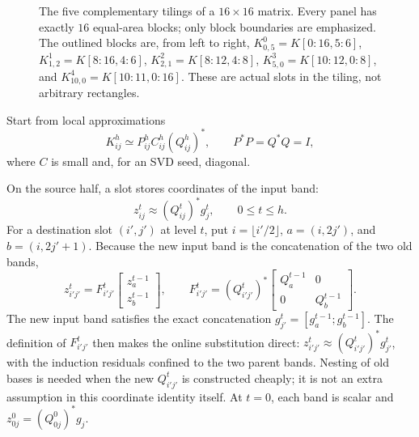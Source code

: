 \documentclass[11pt,a4paper]{article}
\begin{document}
\begin{figure}[htbp]
\caption{The five complementary tilings of a $16\times16$ matrix.  Every panel has exactly $16$ equal-area blocks; only block boundaries are emphasized.  The outlined blocks are, from left to right, $K_{0,5}^0=K[0:16,5:6]$, $K_{1,2}^1=K[8:16,4:6]$, $K_{2,1}^2=K[8:12,4:8]$, $K_{5,0}^3=K[10:12,0:8]$, and $K_{10,0}^4=K[10:11,0:16]$.  These are actual slots in the tiling, not arbitrary rectangles.}
\label{fig:tilings}
\end{figure}

Start from local approximations
\begin{equation}
 K_{ij}^h\simeq P_{ij}^hC_{ij}^h(Q_{ij}^h)^*,
 \qquad P^*P=Q^*Q=I,
 \label{eq:invariant-seed}
\end{equation}
where $C$ is small and, for an SVD seed, diagonal.

On the source half, a slot stores coordinates of the input band:
\begin{equation}
 z_{ij}^{t}\approx(Q_{ij}^{t})^*g_j^t,
 \qquad 0\le t\le h.
 \label{eq:source-invariant}
\end{equation}
For a destination slot $(i',j')$ at level $t$, put $i=\lfloor i'/2\rfloor$, $a=(i,2j')$, and $b=(i,2j'+1)$. Because the new input band is the concatenation of the two old bands,
\begin{equation}
 z_{i'j'}^t=F_{i'j'}^t
 \begin{bmatrix}z_a^{t-1}\\z_b^{t-1}\end{bmatrix},
 \qquad
 F_{i'j'}^t=(Q_{i'j'}^t)^*
 \begin{bmatrix}Q_a^{t-1}&0\\0&Q_b^{t-1}\end{bmatrix}.
 \label{eq:source-transfer}
\end{equation}
The new input band satisfies the exact concatenation $g_{j'}^t=[g_a^{t-1};g_b^{t-1}]$. The definition of $F_{i'j'}^t$ then makes the online substitution direct: $z_{i'j'}^t\approx(Q_{i'j'}^t)^*g_{j'}^t$, with the induction residuals confined to the two parent bands. Nesting of old bases is needed when the new $Q_{i'j'}^t$ is constructed cheaply; it is not an extra assumption in this coordinate identity itself. At $t=0$, each band is scalar and $z_{0j}^0=(Q_{0j}^0)^*g_j$.
\end{document}
